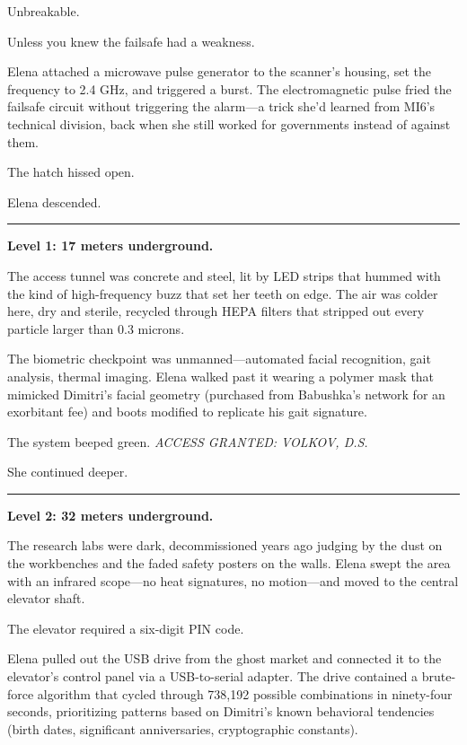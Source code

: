 Unbreakable.

Unless you knew the failsafe had a weakness.

Elena attached a microwave pulse generator to the scanner's housing, set the frequency to 2.4 GHz, and triggered a burst. The electromagnetic pulse fried the failsafe circuit without triggering the alarm---a trick she'd learned from MI6's technical division, back when she still worked for governments instead of against them.

The hatch hissed open.

Elena descended.

\begin{center}\rule{0.5\linewidth}{0.5pt}\end{center}

\textbf{Level 1: 17 meters underground.}

The access tunnel was concrete and steel, lit by LED strips that hummed with the kind of high-frequency buzz that set her teeth on edge. The air was colder here, dry and sterile, recycled through HEPA filters that stripped out every particle larger than 0.3 microns.

The biometric checkpoint was unmanned---automated facial recognition, gait analysis, thermal imaging. Elena walked past it wearing a polymer mask that mimicked Dimitri's facial geometry (purchased from Babushka's network for an exorbitant fee) and boots modified to replicate his gait signature.

The system beeped green. \emph{ACCESS GRANTED: VOLKOV, D.S.}

She continued deeper.

\begin{center}\rule{0.5\linewidth}{0.5pt}\end{center}

\textbf{Level 2: 32 meters underground.}

The research labs were dark, decommissioned years ago judging by the dust on the workbenches and the faded safety posters on the walls. Elena swept the area with an infrared scope---no heat signatures, no motion---and moved to the central elevator shaft.

The elevator required a six-digit PIN code.

Elena pulled out the USB drive from the ghost market and connected it to the elevator's control panel via a USB-to-serial adapter. The drive contained a brute-force algorithm that cycled through 738,192 possible combinations in ninety-four seconds, prioritizing patterns based on Dimitri's known behavioral tendencies (birth dates, significant anniversaries, cryptographic constants).

